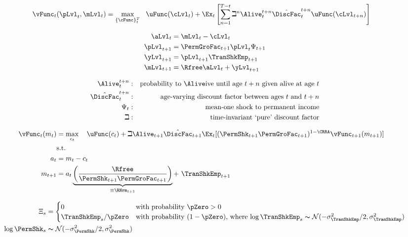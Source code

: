 \begin{align}
    \vFunc_{t}(\pLvl_{t},\mLvl_{t}) & =    \max_{\{\cFunc\}_{t}^{T}}~~ \uFunc(\cLvl_{t})+\Ex_{t}\left[\sum_{n=1}^{T-t} {\beth}^{n} \Alive_{t}^{t+n}\hat{\DiscFac}_{t}^{t+n} \uFunc(\cLvl_{t+n}) \right]   \label{eq:lifecyclemax}
\end{align}

\begin{align}
    \aLvl_{t} & = \mLvl_{t}-\cLvl_{t}
    \\  \pLvl_{t+1}  & = \PermGroFac_{t+1}\pLvl_{t}\Psi_{t+1}
    \\  \yLvl_{t+1}  & = \pLvl_{t+1}\TranShkEmp _{t+1}
    \\  \mLvl_{t+1}  & = \Rfree \aLvl_{t}+\yLvl_{t+1}
\end{align}

\begin{align}
    \Alive _{t}^{t+n} & : & \text{probability to }\Alive\text{ive until age $t+n$ given alive at age $t$}
    \\  \hat{\DiscFac}_{t}^{t+n} &:&\text{age-varying discount factor between ages $t$ and $t+n$}
    \\     \Psi_{t} &:&\text{mean-one shock to permanent income}
    \\     \beth &:&\text{time-invariant `pure' discount factor}
\end{align}

\begin{align}
    {\vFunc}_{t}({m}_{t}) & = \max_{{c}_{t}}~~~ \uFunc({c}_{t})+\beth\Alive_{t+1}\hat{\DiscFac}_{t+1}
    \Ex_{t}[(\PermShk_{t+1}\PermGroFac_{t+1})^{1-\CRRA}{\vFunc}_{t+1}({m}_{t+1})]                                 \\
                          & \text{s.t.}                                                               & \nonumber \\
    {a}_{t}               & = {m}_{t}-{c}_{t} \nonumber
    \\  {m}_{t+1}  & = {a}_{t}\underbrace{\left(\frac{\Rfree}{\PermShk_{t+1}\PermGroFac_{t+1}}\right)}_{\equiv \RNrm_{t+1}}+ ~\TranShkEmp_{t+1}
\end{align}

\begin{align}
    \Xi_{s}           & =
    \begin{cases}
        0\phantom{/\pZero}     & \text{with probability $\pZero>0$}                                                                                                            \\
        \TranShkEmp_{s}/\pZero & \text{with probability $(1-\pZero)$, where $\log \TranShkEmp_{s}\thicksim \mathcal{N}(-\sigma_{\TranShkEmp}^{2}/2,\sigma_{\TranShkEmp}^{2})$} \\
    \end{cases} \\
    \log \PermShk_{s} & \thicksim \mathcal{N}(-\sigma_{\PermShk}^{2}/2,\sigma_{\PermShk}^{2})
\end{align}